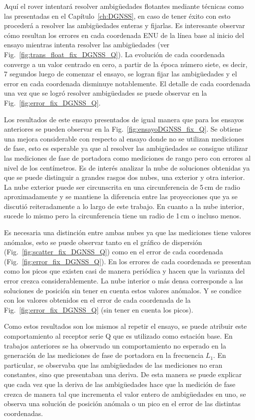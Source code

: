 \documentclass[a4paper,12pt,oneside,onecolumn,final,openright]{book}%
\begin{document}
	Aquí el rover intentará resolver ambigüedades flotantes mediante técnicas como las presentadas en el Capítulo~\ref{ch:DGNSS}, en caso de tener éxito con esto procederá a resolver las ambigüedades enteras y fijarlas. Es interesante observar cómo resultan los errores en cada coordenada ENU de la línea base al inicio del ensayo mientras intenta resolver las ambigüedades (ver Fig.~\ref{fig:trans_float_fix_DGNSS_Q}). La evolución de cada coordenada converge a un valor centrado en cero, a partir de la época número siete, es decir, 7 segundos luego de comenzar el ensayo, se logran fijar las ambigüedades y el error en cada coordenada disminuye notablemente. El detalle de cada coordenada una vez que se logró resolver ambigüedades se puede observar en la Fig.~\ref{fig:error_fix_DGNSS_Q}.
		
	Los resultados de este ensayo presentados de igual manera que para los ensayos anteriores se pueden observar en la Fig.~\ref{fig:ensayoDGNSS_fix_Q}. Se obtiene una mejora considerable con respecto al ensayo donde no se utilizan mediciones de fase, esto es esperable ya que al resolver las ambigüedades se consigue utilizar las mediciones de fase de portadora como mediciones de rango pero con errores al nivel de los centímetros. Es de interés analizar la nube de soluciones obtenidas ya que se puede distinguir a grandes rasgos dos nubes, una exterior y otra interior. La nube exterior puede ser circunscrita en una circunferencia de 5\,cm de radio aproximadamente y se mantiene la diferencia entre las proyecciones que ya se discutió reiteradamente a lo largo de este trabajo. En cuanto a la nube interior, sucede lo mismo pero la circunferencia tiene un radio de 1\,cm o incluso menos. 
	
	Es necesaria una distinción entre ambas nubes ya que las mediciones tiene valores anómalos, esto se puede observar tanto en el gráfico de dispersión (Fig.~\ref{fig:scatter_fix_DGNSS_Q}) como en el error de cada coordenada (Fig.~\ref{fig:error_fix_DGNSS_Q}). En los errores de cada coordenada se presentan como los picos que existen casi de manera periódica y hacen que la varianza del error crezca considerablemente. La nube interior o más densa corresponde a las soluciones de posición sin tener en cuenta estos valores anómalos. Y se condice con los valores obtenidos en el error de cada coordenada de la Fig.~\ref{fig:error_fix_DGNSS_Q} (sin tener en cuenta los picos).
	
	Como estos resultados son los mismos al repetir el ensayo, se puede atribuir este comportamiento al receptor serie Q que es utilizado como estación base. En trabajos anteriores se ha observado un comportamiento no esperado en la generación de las mediciones de fase de portadora en la frecuencia $L_1$. En particular, se observaba que las ambigüedades de las mediciones no eran constantes, sino que presentaban una deriva. De esta manera se puede explicar que cada vez que la deriva de las ambigüedades hace que la medición de fase crezca de manera tal que incrementa el valor entero de ambigüedades en uno, se observa una solución de posición anómala o un pico en el error de las distintas coordenadas.
	 
\end{document}
